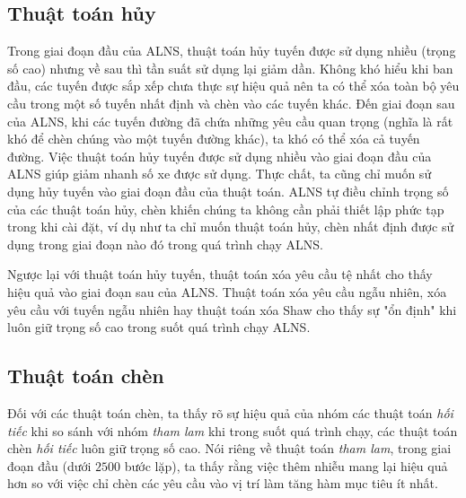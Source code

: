 \subsection*{Thuật toán hủy}
Trong giai đoạn đầu của ALNS, thuật toán hủy tuyến được sử dụng nhiều (trọng số cao) nhưng về sau thì tần suất sử dụng lại giảm dần. Không khó hiểu khi ban đầu, các tuyến được sắp xếp chưa thực sự hiệu quả nên ta có thể xóa toàn bộ yêu cầu trong một số tuyến nhất định và chèn vào các tuyến khác. Đến giai đoạn sau của ALNS, khi các tuyến đường đã chứa những yêu cầu quan trọng (nghĩa là rất khó để chèn chúng vào một tuyến đường khác), ta khó có thể xóa cả tuyến đường. Việc thuật toán hủy tuyến được sử dụng nhiều vào giai đoạn đầu của ALNS giúp giảm nhanh số xe được sử dụng. Thực chất, ta cũng chỉ muốn sử dụng hủy tuyến vào giai đoạn đầu của thuật toán. ALNS tự điều chỉnh trọng số của các thuật toán hủy, chèn khiến chúng ta không cần phải thiết lập phức tạp trong khi cài đặt, ví dụ như ta chỉ muốn thuật toán hủy, chèn nhất định được sử dụng trong giai đoạn nào đó trong quá trình chạy ALNS. 

Ngược lại với thuật toán hủy tuyến, thuật toán xóa yêu cầu tệ nhất cho thấy hiệu quả vào giai đoạn sau của ALNS. Thuật toán xóa yêu cầu ngẫu nhiên, xóa yêu cầu với tuyến ngẫu nhiên hay thuật toán xóa Shaw cho thấy sự "ổn định" khi luôn giữ trọng số cao trong suốt quá trình chạy ALNS.

\subsection*{Thuật toán chèn}
Đối với các thuật toán chèn, ta thấy rõ sự hiệu quả của nhóm các thuật toán \textit{hối tiếc} khi so sánh với nhóm \textit{tham lam} khi trong suốt quá trình chạy, các thuật toán chèn \textit{hối tiếc} luôn giữ trọng số cao. Nói riêng về thuật toán \textit{tham lam}, trong giai đoạn đầu (dưới $2500$ bước lặp), ta thấy rằng việc thêm nhiễu mang lại hiệu quả hơn so với việc chỉ chèn các yêu cầu vào vị trí làm tăng hàm mục tiêu ít nhất. 
